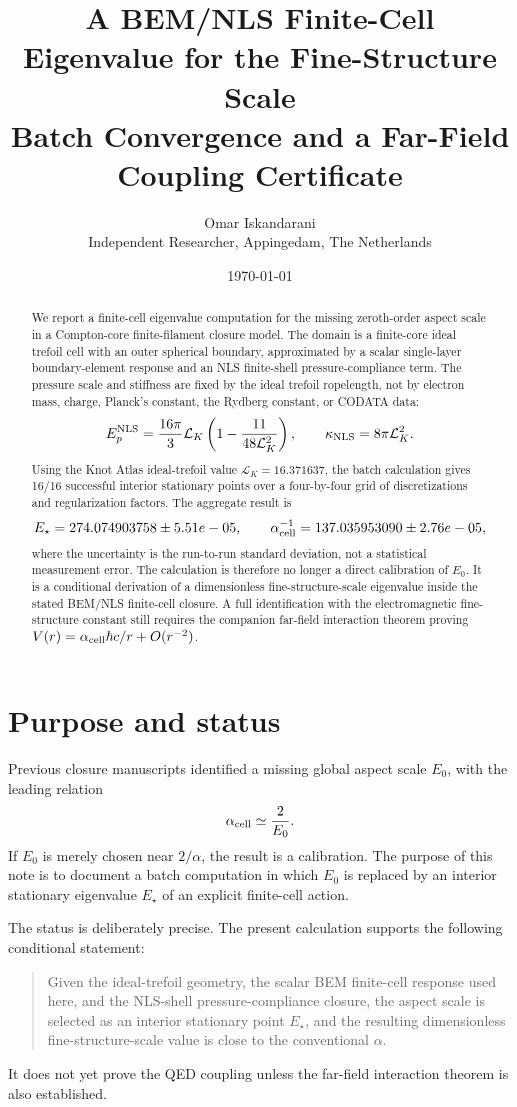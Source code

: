 \documentclass[11pt]{article}
\title{A BEM/NLS Finite-Cell Eigenvalue for the Fine-Structure Scale\\
\large Batch Convergence and a Far-Field Coupling Certificate}
\author{Omar Iskandarani\\\small Independent Researcher, Appingedam, The Netherlands}
\date{\today}
\newcommand{\LK}{\mathcal L_K}
\newcommand{\Estar}{E_\star}
\newcommand{\alphacell}{\alpha_{\rm cell}}
\begin{document}
\maketitle

\begin{abstract}
We report a finite-cell eigenvalue computation for the missing zeroth-order aspect scale in a Compton-core finite-filament closure model. The domain is a finite-core ideal trefoil cell with an outer spherical boundary, approximated by a scalar single-layer boundary-element response and an NLS finite-shell pressure-compliance term. The pressure scale and stiffness are fixed by the ideal trefoil ropelength, not by electron mass, charge, Planck's constant, the Rydberg constant, or CODATA data:
\[
E_p^{\rm NLS}=\frac{16\pi}{3}\LK\left(1-\frac{11}{48\LK^2}\right),
\qquad
\kappa_{\rm NLS}=8\pi\LK^2.
\]
Using the Knot Atlas ideal-trefoil value \(\LK=16.371637\), the batch calculation gives 16/16 successful interior stationary points over a four-by-four grid of discretizations and regularization factors. The aggregate result is
\[
\Estar=274.074903758\pm 5.51e-05,
\qquad
\alphacell^{-1}=137.035953090\pm 2.76e-05,
\]
where the uncertainty is the run-to-run standard deviation, not a statistical measurement error. The calculation is therefore no longer a direct calibration of \(E_0\). It is a conditional derivation of a dimensionless fine-structure-scale eigenvalue inside the stated BEM/NLS finite-cell closure. A full identification with the electromagnetic fine-structure constant still requires the companion far-field interaction theorem proving \(V(r)=\alphacell\hbar c/r+O(r^{-2})\).
\end{abstract}

\section{Purpose and status}

Previous closure manuscripts identified a missing global aspect scale \(E_0\), with the leading relation
\[
\alphacell \simeq \frac{2}{E_0}.
\]
If \(E_0\) is merely chosen near \(2/\alpha\), the result is a calibration. The purpose of this note is to document a batch computation in which \(E_0\) is replaced by an interior stationary eigenvalue \(\Estar\) of an explicit finite-cell action.

The status is deliberately precise. The present calculation supports the following conditional statement:
\begin{quote}
Given the ideal-trefoil geometry, the scalar BEM finite-cell response used here, and the NLS-shell pressure-compliance closure, the aspect scale is selected as an interior stationary point \(\Estar\), and the resulting dimensionless fine-structure-scale value is close to the conventional \(\alpha\).
\end{quote}
It does not yet prove the QED coupling unless the far-field interaction theorem is also established.
\end{document}
